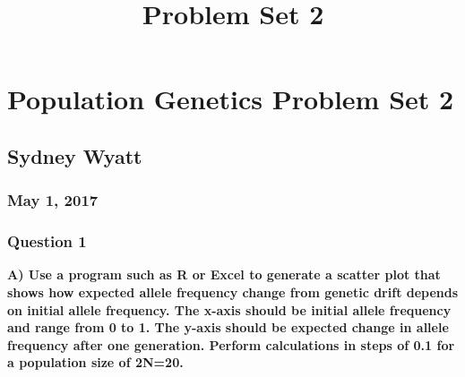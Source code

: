 \documentclass[]{article}
\title{Problem Set 2}
\author{}
\date{}
\begin{document}
\maketitle

\section{Population Genetics Problem Set
2}\label{population-genetics-problem-set-2}

\subsection{Sydney Wyatt}\label{sydney-wyatt}

\subsubsection{May 1, 2017}\label{may-1-2017}

\subsubsection{Question 1}\label{question-1}

\textbf{A) Use a program such as R or Excel to generate a scatter plot
that shows how expected allele frequency change from genetic drift
depends on initial allele frequency. The x-axis should be initial allele
frequency and range from 0 to 1. The y-axis should be expected change in
allele frequency after one generation. Perform calculations in steps of
0.1 for a population size of 2N=20.}
\end{document}
